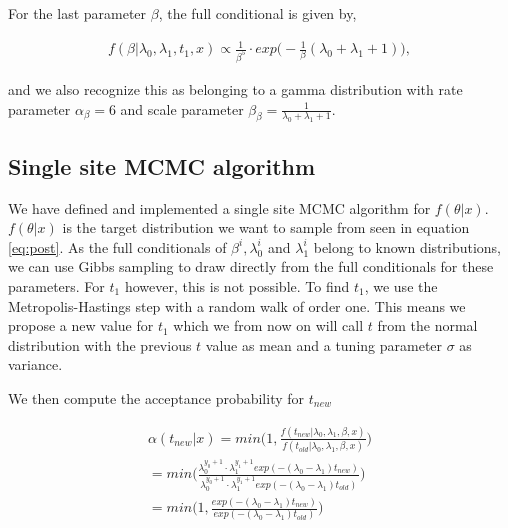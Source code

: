 For the last parameter $\beta$, the full conditional is given by,

\begin{align}
    f(\beta | \lambda_0, \lambda_1, t_1, x) \propto 
    \frac{1}{\beta^5} \cdot exp \Big( -\frac{1}{\beta}(\lambda_0 + \lambda_1 + 1) \Big),
\end{align}

and we also recognize this as belonging to a gamma distribution with rate parameter $\alpha_{\beta} = 6$ and scale parameter $\beta_{\beta} = \frac{1}{\lambda_0 + \lambda_1 + 1} $. 

\subsection{Single site MCMC algorithm}

We have defined and implemented a single site MCMC algorithm for $f(\theta |x)$. $f(\theta|x)$ is the target distribution we want to sample from seen in equation \ref{eq:post}.  As the full conditionals of $\beta^i, \lambda_0^i$ and $\lambda_1^i$ belong to known distributions, we can use Gibbs sampling to draw directly from the full conditionals for these parameters. For $t_1$ however, this is not possible.
To find $t_1$, we use the Metropolis-Hastings step with a random walk of order one. This means we propose a new value for $t_1$ which we from now on will call $t$ from the normal distribution with the previous $t$ value as mean and a tuning parameter $\sigma$ as variance. 


We then compute the acceptance probability for $t_{new}$

\begin{align}
    \alpha(t_{new}|x) = min \Big( 1, \frac{f(t_{new}| \lambda_0, \lambda_1, \beta, x)}{f(t_{old}| \lambda_0, \lambda_1, \beta, x)} \Big) \nonumber \\ 
    = min \Big( \frac{\lambda_0^{y_0 + 1} \cdot \lambda_1^{y_1 + 1} exp(-(\lambda_0 - \lambda_1)t_{new})}{\lambda_0^{y_0 + 1} \cdot \lambda_1^{y_1 + 1} exp(-(\lambda_0 - \lambda_1)t_{old})} \Big) \nonumber \\
    = min \Big( 1, \frac{exp(-(\lambda_0 - \lambda_1)t_{new})}{exp(-(\lambda_0 - \lambda_1)t_{old})} \Big)
\end{align}

